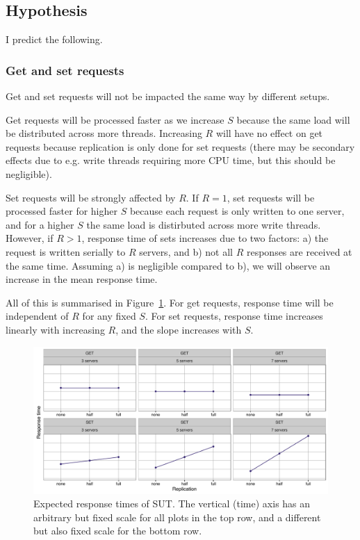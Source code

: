\documentclass[11pt]{article}
\begin{document}
\subsection{Hypothesis}

I predict the following.

\subsubsection{Get and set requests}
Get and set requests will not be impacted the same way by different setups.

Get requests will be processed faster as we increase $S$ because the same load will be distributed across more threads. Increasing $R$ will have no effect on get requests because replication is only done for set requests (there may be secondary effects due to e.g. write threads requiring more CPU time, but this should be negligible).

Set requests will be strongly affected by $R$. If $R=1$, set requests will be processed faster for higher $S$ because each request is only written to one server, and for a higher $S$ the same load is distirbuted across more write threads. However, if $R>1$, response time of sets increases due to two factors: a) the request is written serially to $R$ servers, and b) not all $R$ responses are received at the same time. Assuming a) is negligible compared to b), we will observe an increase in the mean response time.

All of this is summarised in Figure~\ref{fig:exp2:hyp:replication}. For get requests, response time will be independent of $R$ for any fixed $S$. For set requests, response time increases linearly with increasing $R$, and the slope increases with $S$.

\begin{figure}[h]
\centering
\includegraphics[width=\textwidth]{figures/hypothesis_replication.pdf}
\caption{Expected response times of SUT. The vertical (time) axis has an arbitrary but fixed scale for all plots in the top row, and a different but also fixed scale for the bottom row.}
\label{fig:exp2:hyp:replication}
\end{figure}
\end{document}
